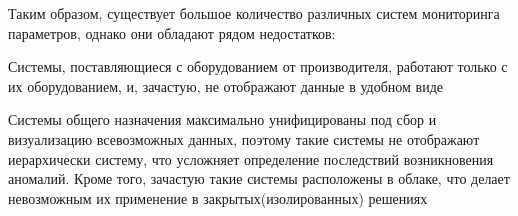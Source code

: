 Таким образом, существует большое количество различных систем мониторинга параметров, однако они обладают рядом недостатков:
\begin{itemize*}
	\item{Системы, поставляющиеся с оборудованием от производителя, работают только с их оборудованием, и, зачастую, не отображают данные в удобном виде}
	\item{Системы общего назначения максимально унифицированы под сбор и визуализацию всевозможных данных, поэтому такие системы не отображают иерархически систему, что усложняет определение последствий возникновения аномалий.  Кроме того, зачастую такие системы расположены в облаке, что делает невозможным их применение в закрытых(изолированных) решениях}
\end{itemize*}





